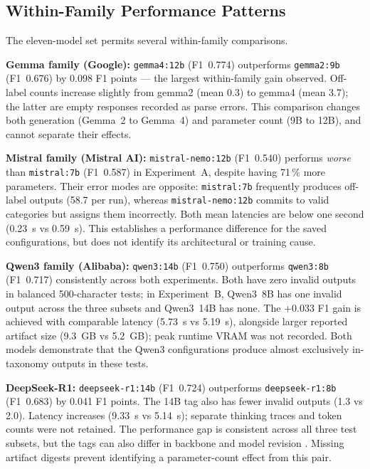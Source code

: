\documentclass[11pt]{article}
\begin{document}
\subsection{Within-Family Performance Patterns}

The eleven-model set permits several within-family comparisons.

\textbf{Gemma family (Google):} \texttt{gemma4:12b} (F1~0.774)
outperforms \texttt{gemma2:9b} (F1~0.676) by 0.098 F1 points —
the largest within-family gain observed. Off-label counts increase slightly from gemma2 (mean 0.3) to
gemma4 (mean 3.7); the latter are empty responses recorded as parse
errors. This comparison changes both generation (Gemma~2 to Gemma~4)
and parameter count (9B to 12B), and cannot separate their effects.

\textbf{Mistral family (Mistral AI):} \texttt{mistral-nemo:12b}
(F1~0.540) performs \emph{worse} than \texttt{mistral:7b} (F1~0.587)
in Experiment~A, despite having 71\,\% more parameters. Their
error modes are opposite: \texttt{mistral:7b} frequently produces
off-label outputs (58.7 per run), whereas \texttt{mistral-nemo:12b}
commits to valid categories but assigns them incorrectly.
Both mean latencies are below one second (0.23~s vs 0.59~s). This establishes a performance difference for the saved
configurations, but does not identify its architectural or training cause.

\textbf{Qwen3 family (Alibaba):} \texttt{qwen3:14b} (F1~0.750)
outperforms \texttt{qwen3:8b} (F1~0.717) consistently across both
experiments. Both have zero invalid outputs in balanced 500-character
tests; in Experiment~B, Qwen3~8B has one invalid output across the
three subsets and Qwen3~14B has none. The
+0.033 F1 gain is achieved with comparable latency (5.73~s vs 5.19~s),
alongside larger reported artifact size (9.3~GB vs 5.2~GB);
peak runtime VRAM was not recorded. Both models demonstrate that the Qwen3
configurations produce almost exclusively in-taxonomy outputs in these tests.

\textbf{DeepSeek-R1:} \texttt{deepseek-r1:14b}
(F1~0.724) outperforms \texttt{deepseek-r1:8b} (F1~0.683) by 0.041
F1 points. The 14B tag also has fewer invalid outputs (1.3 vs 2.0).
Latency increases (9.33~s vs 5.14~s); separate thinking traces
and token counts were not retained. The
performance gap is consistent across all three test subsets, but
the tags can also differ in backbone and model revision
\cite{guo2025deepseekr1,ollama2026deepseekregistry}. Missing artifact
digests prevent identifying a parameter-count effect from this pair.
\end{document}
